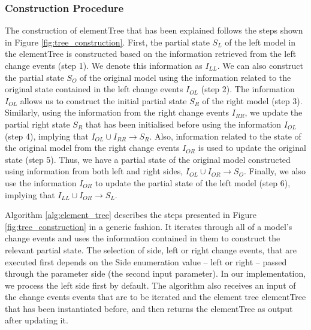\subsubsection{Construction Procedure}\label{sec:construction_procedure}
The construction of \textsf{elementTree} that has been explained follows the steps shown in Figure \ref{fig:tree_construction}. First, the partial
state $S_{L}$ of the left model in the \textsf{elementTree} is constructed based on the information retrieved from the left change events (step 1). We denote this information as $I_{LL}$. We can also construct the partial 
state $S_{O}$ of the original model using the information related to the original state contained in the left change events $I_{OL}$ (step 2). The information $I_{OL}$ allows us to construct the initial partial 
state $S_{R}$ of the right model 
(step 3). Similarly, using the information from the right change events $I_{RR}$, we update the partial right state $S_{R}$ that has been initialised before using the information $I_{OL}$ (step 4), implying that $I_{OL} \cup I_{RR} \rightarrow S_{R}$. Also, information related to the state of the original model from the right change events $I_{OR}$ is used to update the original state  (step 5). Thus, we have a partial state of the original model constructed using information from both left and right sides, $I_{OL} \cup I_{OR} \rightarrow S_{O}$. Finally, we also use the information $I_{OR}$ to update the partial state of the left model (step 6), implying that $I_{LL} \cup I_{OR} \rightarrow S_{L}$.  

Algorithm \ref{alg:element_tree} describes the steps presented in Figure \ref{fig:tree_construction} in a generic fashion. It iterates through all of a model's change events and uses the information contained in them to construct the relevant partial state. The selection of side, left or right change events, that are executed first depends on the \textsf{Side} enumeration value -- \textsf{left} or \textsf{right} -- passed through the parameter \textsf{side} (the second input parameter). In our implementation, we process the left side first by default. The algorithm also receives an input of the change events \textsf{events} that are to be iterated and the element tree \textsf{elementTree} that has been instantiated before, and then returns the \textsf{elementTree} as output after updating it.

